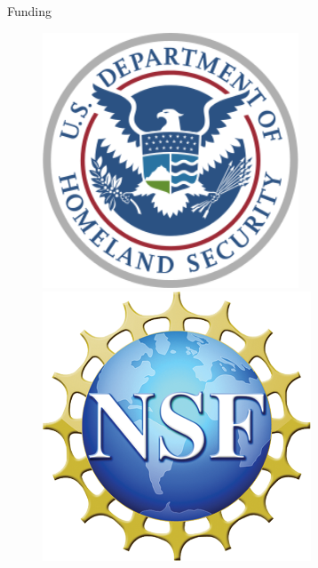 \documentclass{beamer}
\begin{document}
\begin{frame}[t]{}
\begin{columns}
\begin{column}[T]{0.72\textwidth}
\begin{columns}[t]
\begin{column}{0.4\textwidth}
\begin{block}{\large Funding}
\begin{figure}
\begin{minipage}{.5\textwidth}
  \centering
  \includegraphics[height=7.6cm]{logos/dhs.png}
\end{minipage}%
\begin{minipage}{.5\textwidth}
  \centering
  \includegraphics[height=8cm]{logos/nsf.png}
\end{minipage}
\end{figure}

\end{block}

\end{column}
\end{columns}
\end{column}
\end{columns}
\end{frame}
\end{document}
